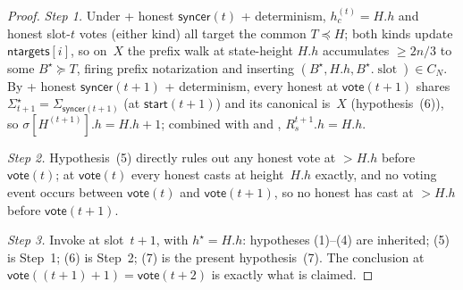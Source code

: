 \documentclass{article}
\newcommand{\slot}[0]{\ensuremath{\operatorname{\mathrm{slot}}}}
\newcommand{\ntargets}{\mathsf{ntargets}}
\newcommand{\syncer}{\mathsf{syncer}}
\newcommand{\start}{\mathsf{start}}
\newcommand{\vote}{\mathsf{vote}}
\theoremstyle{plain}
\theoremstyle{definition}
\theoremstyle{remark}
\begin{document}
\begin{proof}
\emph{Step 1.}
Under  + honest $\syncer(t)$ + determinism, $h_c^{(t)} = H.h$ and honest slot-$t$ votes (either kind) all target the common $T \preceq H$; both kinds update $\ntargets[i]$, so on~$X$ the prefix walk at state-height $H.h$ accumulates $\geq 2n/3$ to some $B^\star \succeq T$, firing prefix notarization and inserting $(B^\star, H.h, B^\star.\slot) \in C_N$.
By  + honest $\syncer(t+1)$ + determinism, every honest at $\vote(t+1)$ shares $\Sigma^\star_{t+1} = \Sigma_{\syncer(t+1)}$ (at $\start(t+1)$) and its canonical is~$X$ (hypothesis~(6)), so $\sigma[H^{(t+1)}].h = H.h + 1$; combined with  and , $R_s^{t+1}.h = H.h$.

\emph{Step 2.}
Hypothesis~(5) directly rules out any honest vote at $> H.h$ before $\vote(t)$; at $\vote(t)$ every honest casts at height~$H.h$ exactly, and no voting event occurs between $\vote(t)$ and $\vote(t+1)$, so no honest has cast at $> H.h$ before $\vote(t+1)$.

\emph{Step 3.}
Invoke  at slot~$t+1$, with $h^\star = H.h$: hypotheses (1)--(4) are inherited; (5) is Step~1; (6) is Step~2; (7) is the present hypothesis~(7).
The conclusion at $\vote((t+1) + 1) = \vote(t+2)$ is exactly what is claimed.
\end{proof}
\end{document}
